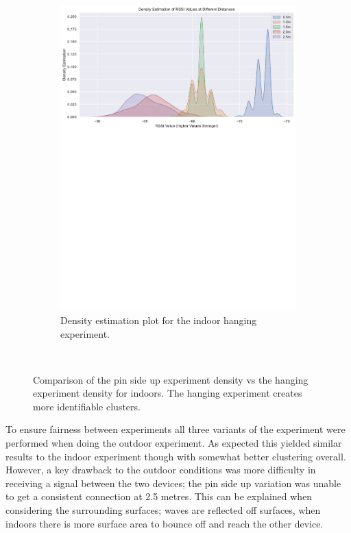 \documentclass{l4proj}
\begin{document}
\begin{figure}[!htb]
\begin{subfigure}[b]{0.45\textwidth}
        \includegraphics[width=\textwidth]{images/indoor_hanging_rssi_density.pdf}
        \caption{ Density estimation plot for the indoor hanging experiment. }
        \label{fig:indoor_hanging_density}
    \end{subfigure}
    ~ %
    \caption{ Comparison of the pin side up experiment density  vs the hanging experiment density for indoors. The hanging experiment creates more identifiable clusters. }
    \label{fig:initial_plots}
\end{figure}

To ensure fairness between experiments all three variants of the experiment were performed when doing the outdoor experiment. As expected this yielded similar results to the indoor experiment though with somewhat better clustering overall. However, a key drawback to the outdoor conditions was more difficulty in receiving a signal between the two devices; the pin side up variation was unable to get a consistent connection at 2.5 metres. This can be explained when considering the surrounding surfaces; waves are reflected off surfaces, when indoors there is more surface area to bounce off and reach the other device.
\end{document}
